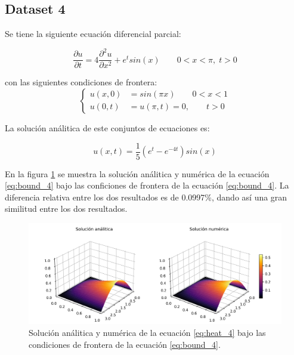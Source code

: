 \subsection{Dataset 4}

Se tiene la siguiente ecuación diferencial parcial:

\begin{equation}
    \frac{\partial u}{\partial t} = 4\frac{\partial^2 u}{\partial x^2}+e^tsin(x)\qquad 0<x<\pi, \; t>0 \label{eq:heat_4}
\end{equation}

con las siguientes condiciones de frontera:
\begin{equation}
    \begin{cases}
        u(x,0) & = sin(\pi x) \qquad 0<x<1 \\
        u(0,t) & =u(\pi,t) = 0, \qquad t>0
    \end{cases} \label{eq:bound_4}
\end{equation}

La solución análitica de este conjuntos de ecuaciones es:

\begin{equation}
    u(x,t)=\frac{1}{5}( e^t-e^{-4t})sin(x) \label{eq:sol_4}
\end{equation}

En la figura \ref{fig:sol_4} se muestra la solución análitica y numérica de la ecuación \ref{eq:bound_4} bajo las conficiones de frontera de la ecuación \ref{eq:bound_4}. La diferencia relativa entre los dos resultados es de 0.0997\%, dando así una gran similitud entre los dos resultados.

\begin{figure}[H]
    \centering
    \includegraphics[width=17cm]{Graphics/surface_4.png}
    \caption{Solución análitica y numérica de la ecuación \ref{eq:heat_4} bajo las condiciones de frontera de la ecuación \ref{eq:bound_4}.}
    \label{fig:sol_4}
\end{figure}
